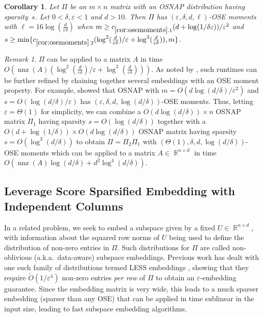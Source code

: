 \documentclass[11pt]{amsart}
\numberwithin{equation}{section}
\numberwithin{equation}{section}
\DeclareMathOperator{\R}{\mathbb{R}}
\DeclareMathOperator{\nnz}{nnz}
\newtheorem{corollary}[theorem]{Corollary}
\theoremstyle{remark}
\newtheorem{remark}[theorem]{Remark}
\theoremstyle{definition}
\begin{document}
\begin{corollary}\label{cor:osemoments}
    Let $\Pi$ be an $m \times n$ matrix with an OSNAP distribution having sparsity~$s$. Let $0 < \delta, \varepsilon < 1$ and $d>10$. Then $\Pi$ has $(\varepsilon, \delta, d, \ell)$-OSE moments with $\ell = 16\log(\frac{d}{\varepsilon \delta})$ when $m \ge c_{\ref*{cor:osemoments}.1}  (d + \log(1/\delta\varepsilon))/\varepsilon^2$ and  $s \geq \min\{c_{\ref*{cor:osemoments}.2} (\log ^2(\frac{d}{\varepsilon\delta})/\varepsilon+\log^3(\frac{d}{\varepsilon\delta})),m\}$.
\end{corollary}
\begin{remark}
$\Pi$ can be applied to a matrix $A$ in time $O(\nnz(A)(\log^2(\frac{d}{\varepsilon\delta})/\varepsilon + \log^3(\frac{d}{\varepsilon\delta})))$.  
As noted by \cite[Remark 3]{cohen2016optimal}, such runtimes can be further refined by chaining together several embeddings with an OSE moment property. For example, \cite{cohen2016nearly} showed that  OSNAP with $m=O(d\log(d/\delta)/\varepsilon^2)$ and $s=O(\log(d/\delta)/\varepsilon)$ has $(\varepsilon,\delta,d,\log(d/\delta))$-OSE moments. Thus, letting $\varepsilon=\Theta(1)$ for simplicity, we can combine a $O(d\log (d/\delta))\times n$ OSNAP matrix $\Pi_1$ having sparsity $s=O(\log(d/\delta))$ together with a $O(d+\log(1/\delta))\times O(d\log(d/\delta))$ OSNAP matrix having sparsity $s=O(\log^3(d/\delta))$ to obtain $\Pi=\Pi_2\Pi_1$ with $(\Theta(1),\delta,d,\log(d/\delta))$-OSE moments which can be applied to a matrix $A\in\R^{n\times d}$ in time $O(\nnz(A)\log(d/\delta) + d^2\log^4(d/\delta))$.
\end{remark}

\subsection{Leverage Score Sparsified Embedding with Independent Columns}
In a related problem, we seek to embed a subspace given by a fixed $U \in \R^{n \times d}$, with information about the squared row norms of $U$ being used to define the distribution of non-zero entries in $\Pi$. Such distributions for $\Pi$ are called non-oblivious (a.k.a.~data-aware) subspace embeddings. Previous work \cite{chenakkod2024optimal} has dealt with one such family of distributions termed LESS embeddings \cite{less-embeddings,newton-less,gaussianization}, showing that they require $\tilde O(1/\varepsilon^4)$ non-zero entries \textit{per row} of $\Pi$ to obtain an $\varepsilon$-embedding guarantee. Since the embedding matrix is very wide, this leads to a much sparser embedding (sparser than any OSE) that can be applied in time sublinear in the input size, leading to fast subspace embedding algorithms. 
\end{document}
